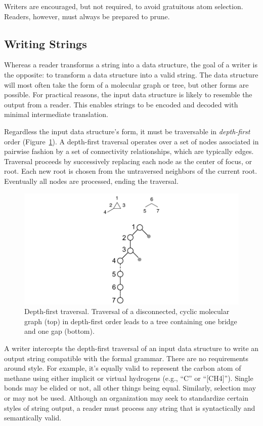 \documentclass{article}
\begin{document}
Writers are encouraged, but not required, to avoid gratuitous atom selection. Readers, however, must always be prepared to prune.

\subsection*{Writing Strings}

Whereas a reader transforms a string into a data structure, the goal of a writer is the opposite: to transform a data structure into a valid string. The data structure will most often take the form of a molecular graph or tree, but other forms are possible. For practical reasons, the input data structure is likely to resemble the output from a reader. This enables strings to be encoded and decoded with minimal intermediate translation.

Regardless the input data structure's form, it must be traversable in \textit{depth-first} order (Figure~\ref{fig:depth-first-traversal}). A depth-first traversal operates over a set of nodes associated in pairwise fashion by a set of connectivity relationships, which are typically edges. Traversal proceeds by successively replacing each node as the center of focus, or root. Each new root is chosen from the untraversed neighbors of the current root. Eventually all nodes are processed, ending the traversal.

\begin{figure}
    \centering
    \includegraphics[width=\columnwidth]{depth-first-traversal.pdf}
    \caption{Depth-first traversal. Traversal of a disconnected, cyclic molecular graph (top) in depth-first order leads to a tree containing one bridge and one gap (bottom).}
    \label{fig:depth-first-traversal}
\end{figure}

A writer intercepts the depth-first traversal of an input data structure to write an output string compatible with the formal grammar. There are no requirements around style. For example, it's equally valid to represent the carbon atom of methane using either implicit or virtual hydrogens (e.g., \enquote{C} or \enquote{[CH4]}). Single bonds may be elided or not, all other things being equal. Similarly, selection may or may not be used. Although an organization may seek to standardize certain styles of string output, a reader must process any string that is syntactically and semantically valid.
\end{document}
